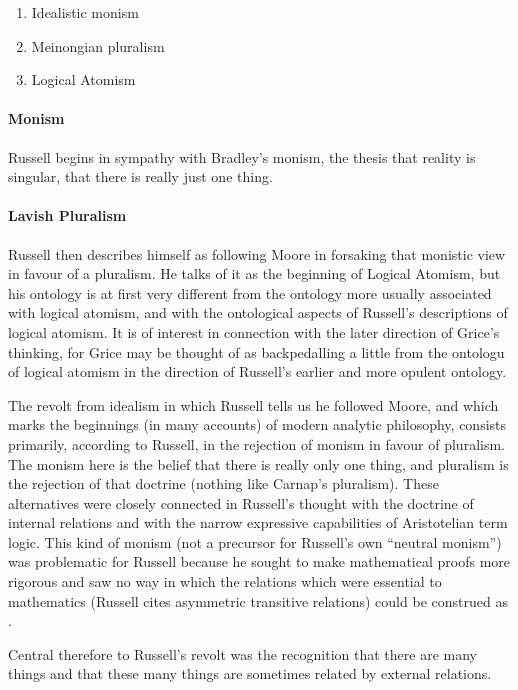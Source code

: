 \documentclass[10pt,titlepage]{article}
\begin{document}
\begin{enumerate}
\item Idealistic monism
\item Meinongian pluralism
\item Logical Atomism
\end{enumerate}

\paragraph{Monism}

Russell begins in sympathy with Bradley's monism, the thesis that reality is singular, that there is really just one thing.

\paragraph{Lavish Pluralism}

Russell then describes himself as following Moore in forsaking that monistic view in favour of a pluralism.
He talks of it as the beginning of Logical Atomism, but his ontology is at first very different from the ontology more usually associated with logical atomism, and with the ontological aspects of Russell's descriptions of logical atomism.
It is of interest in connection with the later direction of Grice's thinking, for Grice may be thought of as backpedalling a little from the ontologu of logical atomism in the direction of Russell's earlier and more opulent ontology.

The revolt from idealism in which Russell tells us he followed Moore, and which marks the beginnings (in many accounts) of modern analytic philosophy, consists primarily, according to Russell, in the rejection of monism in favour of pluralism.
The monism here is the belief that there is really only one thing, and pluralism is the rejection of that doctrine (nothing like Carnap's pluralism).
These alternatives were closely connected in Russell's thought with the doctrine of internal relations and with the narrow expressive capabilities of Aristotelian term logic.
This kind of monism (not a precursor for Russell's own ``neutral monism'') was problematic for Russell because he sought to make mathematical proofs more rigorous and saw no way in which the relations which were essential to mathematics (Russell cites asymmetric transitive relations) could be construed as .

Central therefore to Russell's revolt was the recognition that there are many things and that these many things are sometimes related by external relations.
\end{document}
